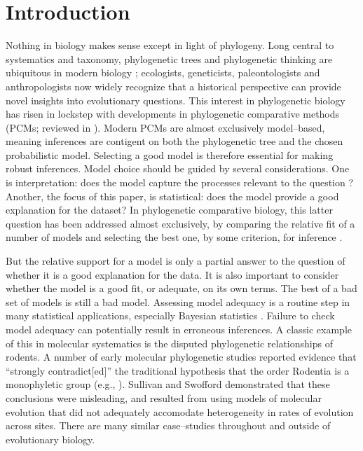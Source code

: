 \documentclass[a4paper,12pt]{article}
\begin{document}
\section{Introduction}
Nothing in biology makes sense except in light of phylogeny. Long central to systematics and taxonomy, phylogenetic trees and phylogenetic thinking are ubiquitous in modern biology \citep{PennellHarmon}; ecologists, geneticists, paleontologists and anthropologists now widely recognize that a historical perspective can provide novel insights into evolutionary questions. This interest in phylogenetic biology has risen in lockstep with developments in phylogenetic comparative methods (PCMs; reviewed in \citep{PennellHarmon}). Modern PCMs are almost exclusively model--based, meaning inferences are contigent on both the phylogenetic tree and the chosen probabilistic model. Selecting a good model is therefore essential for making robust inferences. Model choice should be guided by several considerations. One is interpretation: does the model capture the processes relevant to the question \citep{HansenOrzack2005, Hansen2012, PennellPE}? Another, the focus of this paper, is statistical: does the model provide a good explanation for the dataset? In phylogenetic comparative biology, this latter question has been addressed almost exclusively, by comparing the relative fit of a number of models and selecting the best one, by some criterion, for inference \citep{Mooers1999, Harmon2010, Hunt2012}. 

But the relative support for a model is only a partial answer to the question of whether it is a good explanation for the data. It is also important to consider whether the model is a good fit, or adequate, on its own terms. The best of a bad set of models is still a bad model. Assessing model adequacy is a routine step in many statistical applications, especially Bayesian statistics \citep{Gelmanbook}. Failure to check model adequacy can potentially result in erroneous inferences. A classic example of this in molecular systematics is the disputed phylogenetic relationships of rodents. A number of early molecular phylogenetic studies reported evidence that ``strongly contradict[ed]'' the traditional hypothesis that the order Rodentia is a monophyletic group (e.g., \citep{Graur1991, DErchia1996}). Sullivan and Swofford \citep{SullivanSwofford} demonstrated that these conclusions were misleading, and resulted from using models of molecular evolution that did not adequately accomodate  heterogeneity in rates of evolution across sites. There are many similar case--studies throughout and outside of evolutionary biology.
\end{document}
